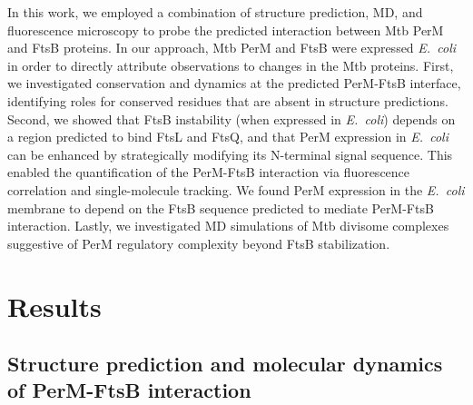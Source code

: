 \documentclass[pdflatex,sn-basic]{sn-jnl}%
\newcommand\ec{\textit{E.~coli}}
\newcommand\mtb{Mtb}
\begin{document}
In this work, we employed a combination of structure prediction, MD, and fluorescence microscopy to probe the predicted interaction between \mtb{} PerM and FtsB proteins. In our approach, \mtb{} PerM and FtsB were expressed \ec{} in order to directly attribute observations to changes in the \mtb{} proteins. First, we investigated conservation and dynamics at the predicted PerM-FtsB interface, identifying roles for conserved residues that are absent in structure predictions. Second, we showed that FtsB instability (when expressed in \ec{}) depends on a region predicted to bind FtsL and FtsQ, and that PerM expression in \ec{} can be enhanced by strategically modifying its N-terminal signal sequence. This enabled the quantification of the PerM-FtsB interaction via fluorescence correlation and single-molecule tracking. We found PerM expression in the \ec{} membrane to depend on the FtsB sequence predicted to mediate PerM-FtsB interaction. Lastly, we investigated MD simulations of \mtb{} divisome complexes suggestive of PerM regulatory complexity beyond FtsB stabilization.

\section{Results}

\subsection{Structure prediction and molecular dynamics of PerM-FtsB interaction}
\end{document}
